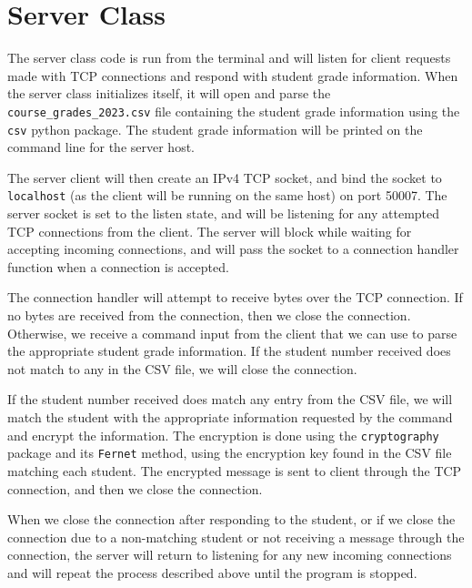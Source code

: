 \section*{Server Class}
The server class code is run from the terminal and will listen for client requests made with TCP connections and respond with student grade information. When the server class initializes itself, it will open and parse the \texttt{course\_grades\_2023.csv} file containing the student grade information using the \texttt{csv} python package. The student grade information will be printed on the command line for the server host.

The server client will then create an IPv4 TCP socket, and bind the socket to \texttt{localhost} (as the client will be running on the same host) on port 50007. The server socket is set to the listen state, and will be listening for any attempted TCP connections from the client. The server will block while waiting for accepting incoming connections, and will pass the socket to a connection handler function when a connection is accepted.

The connection handler will attempt to receive bytes over the TCP connection. If no bytes are received from the connection, then we close the connection. Otherwise, we receive a command input from the client that we can use to parse the appropriate student grade information. If the student number received does not match to any in the CSV file, we will close the connection. 

If the student number received does match any entry from the CSV file, we will match the student with the appropriate information requested by the command and encrypt the information. The encryption is done using the \texttt{cryptography} package and its \texttt{Fernet} method, using the encryption key found in the CSV file matching each student. The encrypted message is sent to client through the TCP connection, and then we close the connection.

When we close the connection after responding to the student, or if we close the connection due to a non-matching student or not receiving a message through the connection, the server will return to listening for any new incoming connections and will repeat the process described above until the program is stopped.
